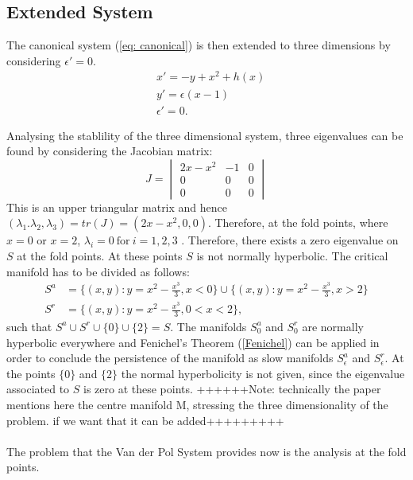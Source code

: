 \subsection{Extended System}
The canonical system (\ref{eq: canonical}) is then extended to three dimensions by considering $\epsilon'=0$. 
\begin{equation} \label{extended FS}
    \begin{aligned}
        &x'=-y+x^2+h(x) \\
        &y'=\epsilon(x-1)\\
        &\epsilon'=0.
    \end{aligned}
\end{equation}


Analysing the stablility of the three dimensional system, three eigenvalues can be found by considering the Jacobian matrix: 
\begin{equation} 
    J=\begin{vmatrix} 2x-x^2 & -1&0 \\ 0 & 0&0\\0&0&0\end{vmatrix}
    \label{eq: Eigenvalues}
\end{equation}
This is an upper triangular matrix and hence $(\lambda_1.\lambda_2,\lambda_3)=tr(J)= (2x-x^2,0,0)$. Therefore, at the fold points, where $x=0$ or $x=2$, $\lambda_i=0 \ \text{for} \ i=1,2,3$ . Therefore, there exists a zero eigenvalue on $S$ at the fold points. At these points $S$ is not normally hyperbolic.
The critical manifold has to be divided as follows:
\begin{align*}
S^a &= \{ (x,y): y = x^2-\frac{x^3}{3}, x< 0 \} \cup  \{ (x,y): y = x^2-\frac{x^3}{3}, x>2 \} \\
S^r &= \{ (x,y): y = x^2-\frac{x^3}{3}, 0< x< 2 \},
\end{align*}
such that $S^a \cup S^r \cup \{0\} \cup \{2\} = S$.
The manifolds $S^a_0$ and $S^r_0$ are normally hyperbolic everywhere and Fenichel's Theorem (\ref{Fenichel}) can be applied in order to conclude the persistence of the manifold as slow manifolds $S^a_\epsilon$ and $S^r_\epsilon$. At the points $\{0\}$ and $\{2 \}$ the normal hyperbolicity is not given, since the eigenvalue associated to $S$ is zero at these points.
++++++Note: technically the paper mentions here the centre manifold M, stressing the three dimensionality of the problem. if we want that it can be added+++++++++
\\
\\
The problem that the Van der Pol System provides now is the analysis at the fold points.
